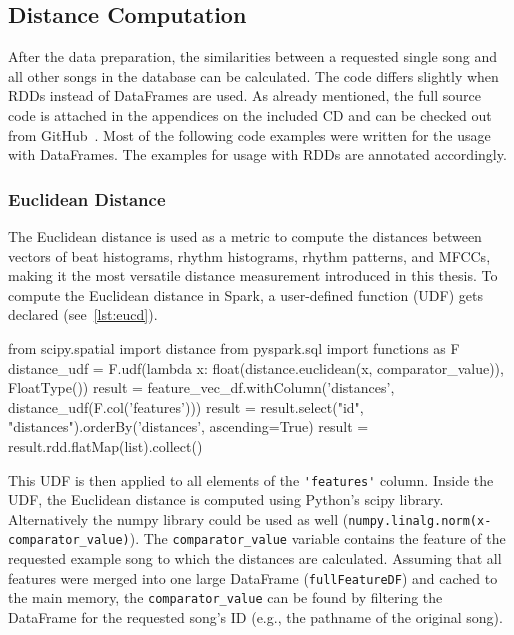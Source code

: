 \subsection{Distance Computation}

After the data preparation, the similarities between a requested single song and all other songs in the database can be calculated. The code differs slightly when RDDs instead of DataFrames are used. As already mentioned, the full source code is attached in the appendices on the included CD and can be checked out from GitHub~\cite{github-code}. Most of the following code examples were written for the usage with DataFrames. The examples for usage with RDDs are annotated accordingly.\\

\subsubsection{Euclidean Distance}

The Euclidean distance is used as a metric to compute the distances between vectors of beat histograms, rhythm histograms, rhythm patterns, and MFCCs, making it the most versatile distance measurement introduced in this thesis. To compute the Euclidean distance in Spark, a user-defined function (UDF) gets declared (see~\ref{lst:eucd}). 

\begin{pythonCode}[frame=single,label={lst:eucd},caption={Euclidean distance DF},captionpos=b]
from scipy.spatial import distance
from pyspark.sql import functions as F
distance_udf = F.udf(lambda x: float(distance.euclidean(x, comparator_value)), FloatType())
result = feature_vec_df.withColumn('distances', distance_udf(F.col('features')))
result = result.select("id", "distances").orderBy('distances', ascending=True)
result = result.rdd.flatMap(list).collect()
\end{pythonCode}

\noindent This UDF is then applied to all elements of the \lstinline{'features'} column. Inside the UDF, the Euclidean distance is computed using Python's scipy library. Alternatively the numpy library could be used as well (\lstinline{numpy.linalg.norm(x-comparator_value)}). The \lstinline{comparator_value} variable contains the feature of the requested example song to which the distances are calculated. Assuming that all features were merged into one large DataFrame (\lstinline{fullFeatureDF}) and cached to the main memory, the \lstinline{comparator_value} can be found by filtering the DataFrame for the requested song's ID (e.g., the pathname of the original song).

